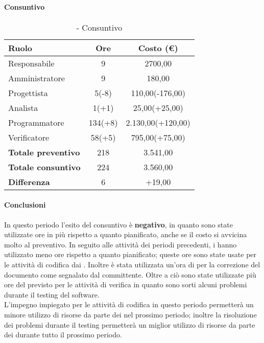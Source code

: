\documentclass[./PianoDiProgetto.tex]{subfiles}
\begin{document}
\paragraph{Consuntivo}	
\begin{table}[H]
		\centering

		\begin{tabular}{l * {2}{c}}
			\toprule
			\textbf{Ruolo} & \textbf{Ore} & \textbf{Costo (\euro{})} \\
			\midrule
			Responsabile & 9    &  2700,00 \\
			Amministratore  & 9    &  180,00 \\
			Progettista  & 5(-8)   &  110,00(-176,00) \\
			Analista & 1(+1)    &  25,00(+25,00) \\
			Programmatore  & 134(+8)    &  2.130,00(+120,00) \\
			Verificatore  & 58(+5)    &  795,00(+75,00) \\
			\midrule
			\textbf{Totale preventivo}  & 218   &  3.541,00 \\
			\textbf{Totale consuntivo}  & 224   &  3.560,00 \\
			\textbf{Differenza}  & 6  &  +19,00 \\
			\bottomrule
		\end{tabular}
		\caption{\PerC{} - Consuntivo}
	\end{table}
	\paragraph{Conclusioni}
	In questo periodo l'esito del consuntivo è \textbf{negativo}, in quanto sono state utilizzate ore in più rispetto a quanto pianificato, anche se il costo si avvicina molto al preventivo. In seguito alle attività dei periodi precedenti, i \PJP{} hanno utilizzato meno ore rispetto a quanto pianificato; queste ore sono state usate per le attività di codifica dai \PRP{}. Inoltre è stata utilizzata un'ora di \AN{} per la correzione del documento \ARdoc{} come segnalato dal committente. Oltre a ciò sono state utilizzate più ore del previsto per le attività di verifica in quanto sono sorti alcuni problemi durante il testing del software.\\
L'impegno impiegato per le attività di codifica in questo periodo permetterà un minore utilizzo  di risorse da parte dei \PRP{} nel prossimo periodo; inoltre la risoluzione dei problemi durante il testing permetterà un miglior utilizzo di risorse da parte dei \VERP{} durante tutto il prossimo periodo.
\clearpage
\end{document}
